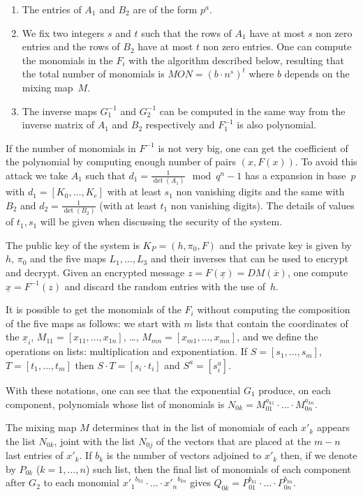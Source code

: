 \documentclass[12pt,a4paper]{amsart}
\theoremstyle{remark}
\theoremstyle{definition}
\begin{document}
\begin{enumerate}
 \item The entries of $A_1$ and $B_2$ are of the form $p^a$.
 \item We fix two integers $s$ and $t$ such that the rows of $A_1$
 have at most $s$ non zero entries and the rows of $B_2$ have at most
 $t$ non zero entries. One can compute the monomials in the $F_i$
 with the algorithm described below, resulting that the total number
 of monomials is 
$MON=(b\cdot n^s)^t$ where $b$ depends on the mixing map~$M$.
\item The inverse maps $G_1^{-1}$ and $G_2^{-1}$ can be computed in the same
way from the inverse matrix of $A_1$ and $B_2$ respectively and
$F_1^{-1}$ is also polynomial.
\end{enumerate}
If the number of monomials in $F^{-1}$ is not very big, one can get the coefficient
of the polynomial by computing enough number of pairs $(x,F(x))$. To avoid
this attack we take $A_1$ such that $d_1=\frac{1}{\det(A_1)}\mod{q^n-1}$
has a expansion in base~$p$ with $d_1=[K_0,\dots,K_e ]$ with at least $s_1$
non vanishing digits and the same with $B_2$ and $d_2=\frac{1}{\det(B_2)}$
(with at least $t_1$ non vanishing digits). The details of values of $t_1,s_1$
will be given when discussing the security of the system.

The public key of the system is $K_P=(h,\pi_0,F)$ and the private key is
given by $h$, $\pi_0$ and the five maps $L_1,\dots,L_3$ and their inverses
that can be used to encrypt and decrypt. Given an encrypted message $z=F(\underline{x})=
DM(\overline{x})$, one compute $\underline{x}=F^{-1}(z)$ and discard the random entries
with the use of~$h$.

It is possible to get the monomials of the $F_i$ without computing the composition
of the five maps as follows: we start with $m$ lists that contain
the coordinates of the $\underline{x}_i$, $M_{11}=[x_{11},\dots,x_{1n}]$, \dots,
$M_{mn}=[x_{m1},\dots,x_{mn}]$, and we define the operations on lists: multiplication
and exponentiation. If $S=[s_1,\dots,s_m]$, $T=[t_1,\dots,t_m]$ then
$S\cdot T=[s_i\cdot t_i]$ and $S^a=[s_i^a]$.

With these notations, one can see that the exponential $G_1$ produce, on each component,
polynomials whose list of monomials is $N_{0k}=M_{01}^{a_{k1}}\cdot\ldots\cdot M_{0n}^{a_{kn}}$.

The mixing map $M$ determines that in the list of monomials of each $x'_k$ appears
the list $N_{0k}$, joint with the list $N_{0j}$ of the vectors that are placed
at the $m-n$ last entries of $x'_k$. If $b_k$ is the number of vectors adjoined
to $x'_k$ then, if we denote by $P_{0k}$ ($k=1,\dots,n$) such list, then the final
list of monomials of each component after $G_2$ to each monomial ${x'_1}^{b_{k1}}\cdot\ldots\cdot{x'_n}^{b_{kn}}$ gives $Q_{0k}=P_{01}^{b_{k1}}\cdot\ldots\cdot P_{0n}^{b_{kn}}$.
\end{document}
